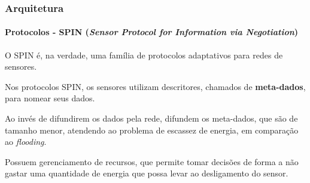 \documentclass[notes]{beamer}
\begin{document}
\begin{frame}
\label{slide_51}
\frametitle{Arquitetura}
\framesubtitle{Protocolos - SPIN (\textit{Sensor Protocol for Information via Negotiation})}

\begin{block}

O SPIN é, na verdade, uma família de protocolos adaptativos para redes de sensores.

\end{block} \pause

\begin{block}

Nos protocolos SPIN, os sensores utilizam descritores, chamados de \textbf{meta-dados}, para nomear seus dados.

\end{block} \pause

\begin{block}

Ao invés de difundirem os dados pela rede, difundem os meta-dados, que são de tamanho menor, atendendo ao problema de escassez de energia, em comparação ao \textit{flooding}.

\end{block} \pause

\begin{block}

Possuem gerenciamento de recursos, que permite tomar decisões de forma a não gastar uma quantidade de energia que possa levar ao desligamento do sensor.

\end{block}

\end{frame}
\end{document}
